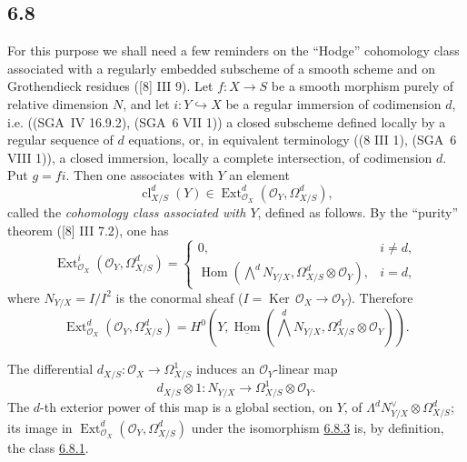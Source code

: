 \documentclass[11pt]{article}
\providecommand{\cO}{\mathcal{O}}
\DeclareMathOperator{\Hom}{Hom}
\DeclareMathOperator{\Ext}{Ext}
\providecommand{\Ker}{\operatorname{Ker}}
\providecommand{\cl}{\operatorname{cl}}
\providecommand{\OO}{\mathcal{O}}
\providecommand{\Hom}{\operatorname{Hom}}
\providecommand{\Ker}{\operatorname{Ker}}
\providecommand{\Ker}{\operatorname{Ker}}
\providecommand{\cl}{\operatorname{cl}}
\providecommand{\Hom}{\operatorname{Hom}}
\providecommand{\cl}{\operatorname{cl}}
\begin{document}
\subsection*{6.8}\label{sga5:III:subsection:6.8}
For this purpose we shall need a few reminders on the ``Hodge'' cohomology class associated with a regularly embedded subscheme of a smooth scheme and on Grothendieck residues ([8] III 9). Let $f:X\to S$ be a smooth morphism purely of relative dimension $N$, and let $i:Y\hookrightarrow X$ be a regular immersion of codimension $d$, i.e. ((SGA~IV 16.9.2), (SGA~6 VII 1)) a closed subscheme defined locally by a regular sequence of $d$ equations, or, in equivalent terminology ((8 III 1), (SGA~6 VIII 1)), a closed immersion, locally a complete intersection, of codimension $d$. Put $g=fi$. Then one associates with $Y$ an element
\begin{equation}
\tag{6.8.1}\label{sga5:III:equation:6.8.1}
\cl^d_{X/S}(Y)\in\Ext^d_{\cO_X}(\cO_Y,\Omega^d_{X/S}),
\end{equation}
called the \emph{cohomology class associated with $Y$}, defined as follows. By the ``purity'' theorem ([8] III 7.2), one has
\begin{equation}
\tag{6.8.2}\label{sga5:III:equation:6.8.2}
\Ext^i_{\cO_X}(\cO_Y,\Omega^d_{X/S})=
\begin{cases}
0,& i\ne d,\\
\Hom(\bigwedge^d N_{Y/X},\Omega^d_{X/S}\otimes\cO_Y),& i=d,
\end{cases}
\end{equation}
where $N_{Y/X}=I/I^2$ is the conormal sheaf ($I=\Ker\,\cO_X\to\cO_Y$). Therefore
\begin{equation}
\tag{6.8.3}\label{sga5:III:equation:6.8.3}
\Ext^d_{\cO_X}(\cO_Y,\Omega^d_{X/S})=H^0(Y,\underline{\Hom}(\bigwedge^dN_{Y/X},\Omega^d_{X/S}\otimes\cO_Y)).
\end{equation}

The differential $d_{X/S}:\OO_X\to\Omega^1_{X/S}$ induces an $\OO_Y$-linear map
\[
d_{X/S}\otimes 1:N_{Y/X}\longrightarrow \Omega^1_{X/S}\otimes\OO_Y.
\]
The $d$-th exterior power of this map is a global section, on $Y$, of $\Lambda^d N_{Y/X}^{\vee}\otimes\Omega^d_{X/S}$; its image in $\Ext^d_{\OO_X}(\OO_Y,\Omega^d_{X/S})$ under the isomorphism \hyperref[sga5:III:equation:6.8.3]{6.8.3} is, by definition, the class \hyperref[sga5:III:equation:6.8.1]{6.8.1}.
\end{document}
